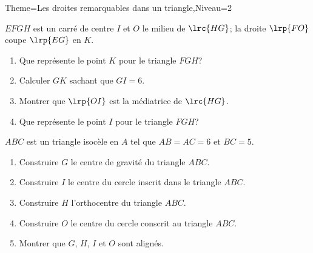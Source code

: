 \documentclass[a4paper,12pt]{article}
\begin{document}
\begin{Maquette}[Fiche]{Theme=Les droites remarquables dans un triangle,Niveau=2}
\begin{exercice}
$EFGH$ est un carré de centre $I$ et $O$ le milieu de $\lrc{HG}$; la droite $\lrp{FO}$ coupe $\lrp{EG}$ en $K$.
\begin{minipage}{0.55\linewidth}
\begin{enumerate}
\item Que représente le point $K$ pour le triangle $FGH$?
\item Calculer $GK$ sachant que $GI=6$.
\item Montrer que $\lrp{OI}$ est la médiatrice de $\lrc{HG}$.
\item Que représente le point $I$ pour le triangle $FGH$?
\end{enumerate}
\end{minipage}%
\begin{minipage}{0.45\linewidth}
\begin{center}
\end{center}
\end{minipage}
\end{exercice}

\begin{exercice}
$ABC$ est un triangle isocèle en $A$ tel que $AB=AC=6$ et $BC=5$.
\begin{enumerate}
\item Construire $G$ le centre de gravité du triangle $ABC$.
\item Construire $I$ le centre du cercle inscrit dans le triangle $ABC$.
\item Construire $H$ l'orthocentre du triangle $ABC$.
\item Construire $O$ le centre du cercle conscrit au triangle $ABC$.
\item Montrer que $G$, $H$, $I$ et $O$ sont alignés.
\end{enumerate}
\end{exercice}


\end{Maquette}
\end{document}
